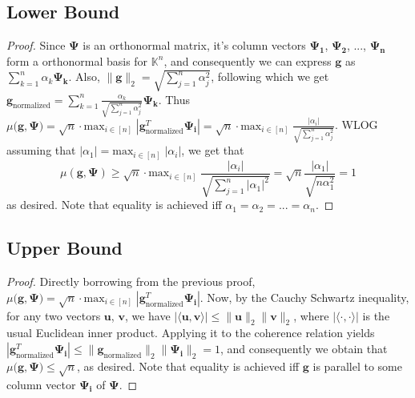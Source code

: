 \documentclass[a4paper,11pt]{article}
\numberwithin{definition}{section}
\numberwithin{mytheorem}{subsection}
\begin{document}
\subsection{Lower Bound}
\begin{proof}
Since $\boldsymbol{\Psi}$ is an orthonormal matrix, it's column vectors $\boldsymbol{\Psi_1}$, $\boldsymbol{\Psi_2}$, ..., $\boldsymbol{\Psi_n}$ form a orthonormal basis for $\mathbb{K}^n$, and consequently we can express $\boldsymbol{g}$ as $\sum_{k=1}^{n} \alpha_k\boldsymbol{\Psi_k}$. Also, $\lVert \boldsymbol{g}\rVert_2 = \sqrt{\sum_{j=1}^{n} \alpha^2_j}$, following which we get $\boldsymbol{g}_{\mathrm{normalized}} = \sum_{k=1}^{n} \frac{\alpha_k}{\sqrt{\sum_{j=1}^{n} \alpha^2_j}}\boldsymbol{\Psi_k}$. Thus $\mu(\boldsymbol{g, \Psi)} = \sqrt{n}\cdot\mathrm{max}_{i\in[n]}\;|\boldsymbol{g}_{\mathrm{normalized}}^T\boldsymbol{\Psi_i}| = \sqrt{n}\cdot\mathrm{max}_{i\in[n]}\;\frac{|\alpha_i|}{\sqrt{\sum_{j=1}^{n} \alpha^2_j}}$. WLOG assuming that $|\alpha_1| = \mathrm{max}_{i\in[n]}\;|\alpha_i|$, we get that
$$\mu(\boldsymbol{g, \Psi}) \geq \sqrt{n}\cdot\mathrm{max}_{i\in[n]}\;\frac{|\alpha_i|}{\sqrt{\sum_{j=1}^{n} |\alpha_1|^2}} = \sqrt{n}\frac{|\alpha_1|}{\sqrt{n\alpha^2_1}} = 1$$
as desired. Note that equality is achieved iff $\alpha_1 = \alpha_2 = ... = \alpha_n$.
\end{proof}
\subsection{Upper Bound}
\begin{proof}
Directly borrowing from the previous proof, $\mu(\boldsymbol{g, \Psi)} = \sqrt{n}\cdot\mathrm{max}_{i\in[n]}\;|\boldsymbol{g}_{\mathrm{normalized}}^T\boldsymbol{\Psi_i}|$. Now, by the Cauchy Schwartz inequality, for any two vectors $\boldsymbol{u}$, $\boldsymbol{v}$, we have $|\langle \boldsymbol{u}, \boldsymbol{v}\rangle|\leq \lVert \boldsymbol{u}\rVert_2\lVert \boldsymbol{v}\rVert_2$, where $|\langle \cdot, \cdot\rangle|$ is the usual Euclidean inner product. Applying it to the coherence relation yields $|\boldsymbol{g}_{\mathrm{normalized}}^T\boldsymbol{\Psi_i}| \leq \lVert \boldsymbol{g}_{\mathrm{normalized}}\rVert_2\lVert \boldsymbol{\Psi_i}\rVert_2 = 1$, and consequently we obtain that $\mu(\boldsymbol{g, \Psi)} \leq \sqrt{n}$, as desired. Note that equality is achieved iff $\boldsymbol{g}$ is parallel to some column vector $\boldsymbol{\Psi_i}$ of $\boldsymbol{\Psi}$.
\end{proof}

\newpage
\end{document}
